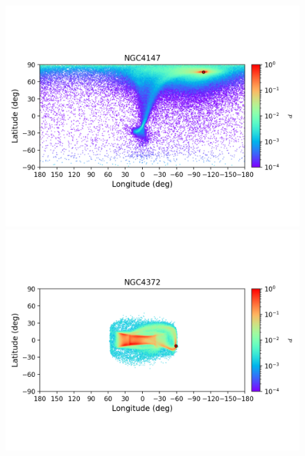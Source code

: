 \begin{figure}
\begin{center}
                \includegraphics[clip=true, trim = 0mm 20mm 0mm 10mm, width=1\columnwidth]{images/error_plots_NGC4147.png}
                \includegraphics[clip=true, trim = 0mm 20mm 0mm 10mm, width=1\columnwidth]{images/error_plots_NGC4372.png}
                

\end{center}
\end{figure}
